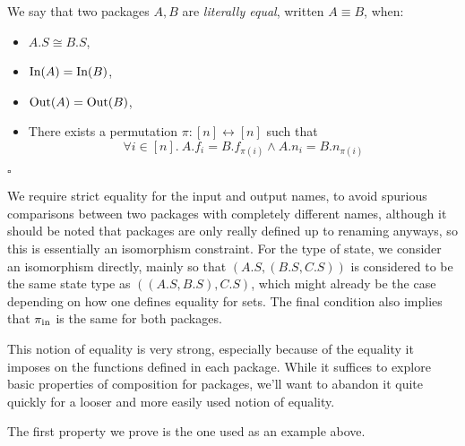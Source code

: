 \begin{definition}
    We say that two packages $A, B$ are \emph{literally equal},
    written $A \equiv B$, when:
    \begin{itemize}
        \item $A.S \cong B.S$,
        \item $\text{In}(A) = \text{In}(B)$,
        \item $\text{Out}(A) = \text{Out}(B)$,
        \item There exists a permutation $\pi : [n] \leftrightarrow [n]$ such that
        $$\forall i \in [n].\ A.f_i = B.f_{\pi(i)} \land A.n_i = B.n_{\pi(i)}$$
    \end{itemize}

    $\square$
\end{definition}

We require strict equality for the input and output names,
to avoid spurious comparisons between two packages with completely different names,
although it should be noted that packages are only really defined up to renaming anyways,
so this is essentially an isomorphism constraint.
For the type of state, we consider an isomorphism directly,
mainly so that $(A.S, (B.S, C.S))$ is considered to be the same state
type as $((A.S, B.S), C.S)$, which might already be the case depending on
how one defines equality for sets.
The final condition also implies that $\pi_{\text{in}}$ is the same
for both packages.

This notion of equality is very strong, especially because of the equality
it imposes on the functions defined in each package.
While it suffices to explore basic properties of composition for packages,
we'll want to abandon it quite quickly for a looser and more easily
used notion of equality.

The first property we prove is the one used as an example above.

